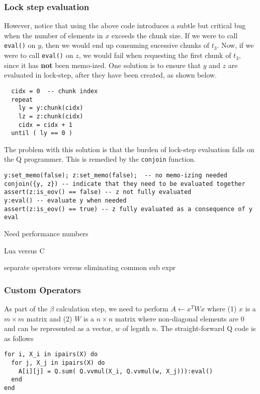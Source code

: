\subsubsection{Lock step evaluation}
However, notice that using the above code introduces a subtle but
critical bug when the number of elements in \(x\) exceeds the chunk
size.  If we were to call {\tt eval()} on \(y\), then we would
end up consuming sucessive chunks of \(t_3\). Now, if we were to call
{\tt eval()} on \(z\), we would fail when requesting the first
chunk of \(t_3\), since it has {\bf not} been memo-ized. One solution
is to ensure that \(y\) and \(z\) are evaluated in lock-step, after they have
been created, as shown below.
\begin{verbatim} 
  cidx = 0  -- chunk index
  repeat 
    ly = y:chunk(cidx)
    lz = z:chunk(cidx)
    cidx = cidx + 1
  until ( ly == 0 )
\end{verbatim}

The problem with this solution is that the burden of lock-step evaluation falls
on the Q programmer. This is remedied by the {\tt conjoin} function.

\begin{verbatim}
y:set_memo(false); z:set_memo(false);  -- no memo-izing needed
conjoin({y, z}) -- indicate that they need to be evaluated together
assert(z:is_eov() == false) -- z not fully evaluated
y:eval() -- evaluate y when needed
assert(z:is_eov() == true) -- z fully evaluated as a consequence of y eval
\end{verbatim}

Need performance numbers \TBC
\be
\item Lua versus C
\item separate operators versus eliminating common sub expr
\ee

\subsubsection{Custom Operators}

As part of the \(\beta\) calculation step, we need to perform \(A \leftarrow x^T
W x\) where (1) 
\(x\) is a \(m \times m\) matrix and (2) \(W\) is a \(n \times n\) matrix where
non-diagonal elements are 0 and can be represented as a vector, \(w\) of legnth
\(n\).
The straight-forward Q code is as follows
\begin{verbatim}
for i, X_i in ipairs(X) do
  for j, X_j in ipairs(X) do
    A[i][j] = Q.sum( Q.vvmul(X_i, Q.vvmul(w, X_j))):eval()
  end
end
\end{verbatim}

